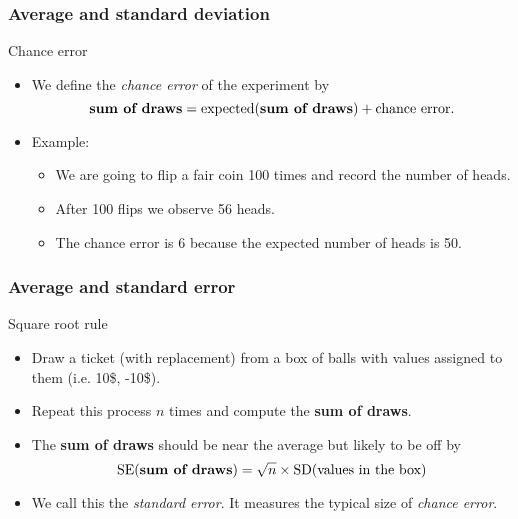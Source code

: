 \documentclass[handout]{beamer}
\begin{document}

   \begin{frame} \frametitle{Average and standard deviation}

   \begin{block}
   {Chance error}
   \begin{itemize}
   \item We define the {\em chance error} of the experiment by
   $$
   \text{{\bf sum of draws}} = \text{expected({\bf sum of draws})} + \text{chance error}.
   $$
   \item Example:
     \begin{itemize}
     \item We are going to flip a fair coin 100 times and record the number of heads.

     \item After 100 flips we observe 56 heads.
     \item The chance error is 6 because the expected number of heads is 50.
     \end{itemize}

   \end{itemize}
   \end{block}
   \end{frame}


   \begin{frame} \frametitle{Average and standard error}

   \begin{block}
   {Square root rule}
   \begin{itemize}
   \item Draw a ticket (with replacement) from a box of balls with values
   assigned to them
   (i.e. 10\$, -10\$).
   \item Repeat this process $n$ times and compute the {\bf sum of draws}.
   \item The {\bf sum of draws} should be near the
   average but likely to be off by
   $$
   \text{SE({\bf sum of draws})} = \sqrt{n} \times \text{SD}(\text{values in the box})
   $$
   \item We call this the {\em standard error}. It measures the typical size of
   {\em chance error}.
   \end{itemize}
   \end{block}
   \end{frame}
\end{document}
